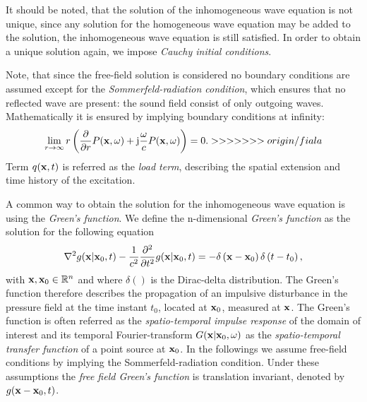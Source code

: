 It should be noted, that the solution of the inhomogeneous wave equation is not unique, since any solution for the homogeneous wave equation may be added to the solution, the inhomogeneous wave equation is still satisfied. In order to obtain a unique solution again, we impose \emph{Cauchy initial conditions}.

Note, that since the free-field solution is considered no boundary conditions are assumed except for the \emph{Sommerfeld-radiation condition}, which ensures that no reflected wave are present: the sound field consist of only outgoing waves. Mathematically it is ensured by implying boundary conditions at infinity:
\begin{equation}
\lim_{r \rightarrow \infty} r \left( \frac{\partial}{\partial r}P(\mathbf{x},\omega) +\mathrm{j} \frac{\omega}{c}P(\mathbf{x},\omega) \right) = 0.
\label{Eq:Theory:Sommerfeld_radiation_condition}
>>>>>>> origin/fiala
\end{equation}
Term $q(\mathbf{x},t)$ is referred as the \emph{load term}, describing the spatial extension and time history of the excitation.

\vspace{3mm}
A common way to obtain the solution for the inhomogeneous wave equation is using the \emph{Green's function}. We define the n-dimensional \emph{Green's function} as the solution for the following equation \cite{Gumerov2004, Williams1999}
\begin{equation}
\nabla^2 g(\mathbf{x}|\mathbf{x}_0,t) -\frac{1}{c^2}\frac{\partial^2}{\partial t^2} g(\mathbf{x}|\mathbf{x}_0,t) = -\delta\left( \mathbf{x} - \mathbf{x}_0 \right)\delta\left( t - t_0 \right),
\label{Eq:Theory:Green_function_def}
\end{equation}
with $\mathbf{x}, \mathbf{x}_0 \in \mathbb{R}^{n}$ and where $\delta()$ is the Dirac-delta distribution. The Green's function therefore describes the propagation of an impulsive disturbance in the pressure field at the time instant $t_0$, located at $\mathbf{x}_0$, measured at $\mathbf{x}$. The Green's function is often referred as the \emph{spatio-temporal impulse response} of the domain of interest and its temporal Fourier-transform $G(\mathbf{x}|\mathbf{x}_0,\omega)$ as the \emph{spatio-temporal transfer function} of a point source at $\mathbf{x}_0$. In the followings we assume free-field conditions by implying the Sommerfeld-radiation condition. Under these assumptions the \emph{free field Green's function} is translation invariant, denoted by $g(\mathbf{x}-\mathbf{x}_0,t)$.

